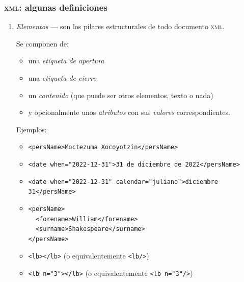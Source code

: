 \documentclass[%
  handout, %
  ]{beamer}
\newcommand*{\rojoit}[1]{\textit{\textcolor[HTML]{8B0000}{#1}}}
\newcommand*{\XML}{\textsc{xml}}
\begin{document}
\begin{frame}[fragile]
  \frametitle{\XML: algunas definiciones}
  \begin{enumerate}
    \item \rojoit{Elementos} --- son los pilares estructurales de todo documento \XML.

      Se componen de:
      \begin{itemize}
        \item una \textit{etiqueta de apertura}
        \item una \textit{etiqueta de cierre}
        \item un \textit{contenido} (que puede ser otros elementos, texto o nada)
        \item y opcionalmente unos \textit{atributos} con sus \textit{valores} correspondientes.
      \end{itemize}
      Ejemplos:

      \begin{itemize}
        \item \texttt{<persName>Moctezuma Xocoyotzin</persName>}
        \item \texttt{<date when="2022-12-31">31 de diciembre de 2022</persName>}
        \item \texttt{<date when="2022-12-31" calendar="juliano">diciembre 31</persName>}
        \item
\begin{verbatim}
<persName>
  <forename>William</forename>
  <surname>Shakespeare</surname>
</persName>
\end{verbatim}
          
        \item \texttt{<lb></lb>} (o equivalentemente \texttt{<lb/>})
        \item \texttt{<lb n="3"></lb>} (o equivalentemente \texttt{<lb n="3"/>})
      \end{itemize}
  \end{enumerate}
\end{frame}
\end{document}
